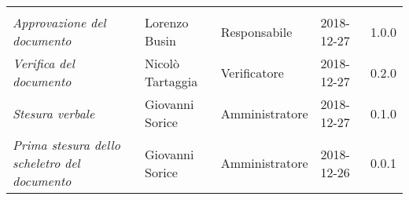 \newpage 
\section*{}
\begin{table}[H]
	\centering
	\begin{tabular}{p{4cm}|C{3cm}|C{3cm}|R{2.5cm}|R{2cm}}
		
		 & & & & \\
		
		
		\emph{Approvazione del documento} &  Lorenzo Busin & Responsabile & 2018-12-27 & 1.0.0 \\
		\hline
		
		\emph{Verifica del documento} & Nicolò Tartaggia & Verificatore & 2018-12-27 & 0.2.0 \\
		\hline

		\emph{Stesura verbale} & Giovanni Sorice & Amministratore & 2018-12-27 & 0.1.0 \\
		\hline
		
		\emph{Prima stesura dello scheletro del documento} & Giovanni Sorice & Amministratore & 2018-12-26 & 0.0.1 \\
		
	\end{tabular}
	
\end{table}


\clearpage